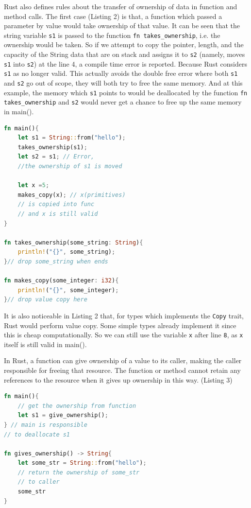 \documentclass[10pt,a4paper,twocolumn]{article}
\newcommand{\code}[1]{\colorbox{light-gray}{\texttt{#1}}}
\begin{document}
Rust also defines rules about the transfer of ownership of data in function and method calls. The first case (Listing 2) is that, a function which passed a parameter by value would take ownership of that value. It can be seen that the string variable \code{s1} is passed to the function \lstinline{fn takes_ownership}, i.e. the ownership would be taken. So if we attempt to copy the pointer, length, and the capacity of the String data that are on stack and assigns it to \code{s2} (namely, moves \code{s1} into \code{s2}) at the line 4, a compile time error is reported. Because Rust considers \code{s1} as no longer valid. This actually avoids the double free error where both \code{s1} and \code{s2} go out of scope, they will both try to free the same memory. And at this example, the memory which \code{s1} points to would be deallocated by the function \lstinline{fn takes_ownership} and \code{s2} would never get a chance to free up the same memory in main().

\begin{lstlisting}[language=Rust, style=boxed, caption={Ownership Move and Stacked-based Value Copy}]
fn main(){
    let s1 = String::from("hello");
    takes_ownership(s1);
    let s2 = s1; // Error, 
    //the ownership of s1 is moved

    let x =5;
    makes_copy(x); // x(primitives)
    // is copied into func
    // and x is still valid
}

fn takes_ownership(some_string: String){
    println!("{}", some_string);
}// drop some_string when ends

fn makes_copy(some_integer: i32){
    println!("{}", some_integer);
}// drop value copy here
\end{lstlisting}

It is also noticeable in Listing 2 that, for types which implements the \code{Copy} trait, Rust would perform value copy. Some simple types already implement it since this is cheap computationally. So we can still use the variable \code{x} after line \code{8}, as \code{x} itself is still valid in main(). 

In Rust, a function can give ownership of a value to its caller, making the caller responsible for freeing that resource. The function or method cannot retain any references to the resource when it gives up ownership in this way. (Listing 3)

\begin{lstlisting}[language=Rust, style=boxed, caption={Function Return Ownership}]
fn main(){
    // get the ownership from function
    let s1 = give_ownership();
} // main is responsible 
// to deallocate s1

fn gives_ownership() -> String{
    let some_str = String::from("hello");
    // return the ownership of some_str 
    // to caller
    some_str
}
\end{lstlisting}
\end{document}
